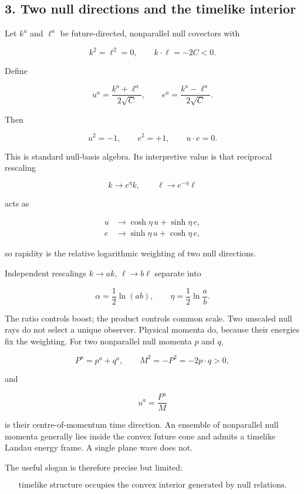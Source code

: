 \documentclass[
]{article}
\begin{document}
\subsection{3. Two null directions and the timelike
interior}\label{two-null-directions-and-the-timelike-interior}

Let \(k^a\) and \(\ell^a\) be future-directed, nonparallel null
covectors with

\[
k^2=\ell^2=0,
\qquad
k\cdot\ell=-2C<0.
\]

Define

\[
u^a=\frac{k^a+\ell^a}{2\sqrt C},
\qquad
e^a=\frac{k^a-\ell^a}{2\sqrt C}.
\]

Then

\[
u^2=-1,
\qquad
e^2=+1,
\qquad
u\cdot e=0.
\]

This is standard null-basis algebra. Its interpretive value is that
reciprocal rescaling

\[
k\rightarrow e^\eta k,
\qquad
\ell\rightarrow e^{-\eta}\ell
\]

acts as

\[
\begin{aligned}
 u&\rightarrow\cosh\eta\,u+\sinh\eta\,e,\\
 e&\rightarrow\sinh\eta\,u+\cosh\eta\,e,
\end{aligned}
\]

so rapidity is the relative logarithmic weighting of two null
directions.

Independent rescalings \(k\rightarrow ak\), \(\ell\rightarrow b\ell\)
separate into

\[
\alpha=\frac12\ln(ab),
\qquad
\eta=\frac12\ln\frac ab.
\]

The ratio controls boost; the product controls common scale. Two
unscaled null rays do not select a unique observer. Physical momenta do,
because their energies fix the weighting. For two nonparallel null
momenta \(p\) and \(q\),

\[
P^a=p^a+q^a,
\qquad
M^2=-P^2=-2p\cdot q>0,
\]

and

\[
u^a=\frac{P^a}{M}
\]

is their centre-of-momentum time direction. An ensemble of nonparallel
null momenta generally lies inside the convex future cone and admits a
timelike Landau energy frame. A single plane wave does not.

The useful slogan is therefore precise but limited:

\[
\boxed{
\text{timelike structure occupies the convex interior generated by null relations.}
}
\]
\end{document}
